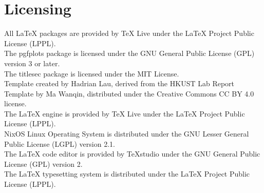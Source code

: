 \documentclass[a4paper,12pt]{article}
\begin{document}
	\section{Licensing}
	All LaTeX packages are provided by TeX Live under the LaTeX Project Public License (LPPL).\\
	The pgfplots package is licensed under the GNU General Public License (GPL) version 3 or later.\\
	The titlesec package is licensed under the MIT License.\\
	Template created by Hadrian Lau, derived from the HKUST Lab Report Template by Ma Wanqin, distributed under the Creative Commons CC BY 4.0 license.\\
	The LaTeX engine is provided by TeX Live under the LaTeX Project Public License (LPPL).\\
	NixOS Linux Operating System is distributed under the GNU Lesser General Public License (LGPL) version 2.1.\\
	The LaTeX code editor is provided by TeXstudio under the GNU General Public License (GPL) version 2.\\
	The LaTeX typesetting system is distributed under the LaTeX Project Public License (LPPL).\\
	
	
\end{document}
